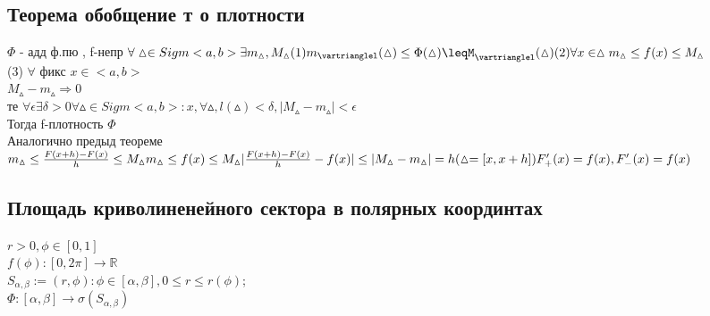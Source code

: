 \documentclass[12pt, a4paper]{article}
\newcommand{\nl}{\newline}
\begin{document}
{ \subsection{Теорема обобщение т о плотности} 
    $\Phi$ - адд ф.пю , f-непр
   	$ \forall \vartriangle \in Sigm<a,b> \exists m_\vartriangle ,M_\vartriangle \\
    (1)
    m_\vartrianglel(\vartriangle) \leq \Phi(\vartriangle)\leqM_\vartrianglel(\vartriangle)\\
    (2) \forall x \in \vartriangle m_\vartriangle \leq f(x) \leq  M_\vartriangle$\\
    (3) $\forall$ фикс $x \in <a,b>$\\
    $M_\vartriangle-m_\vartriangle \Rightarrow 0$ \\
    те $\forall \epsilon  \exists \delta > 0  \forall \vartriangle \in Sigm<a,b>: x,  \forall \vartriangle, l(\vartriangle) < \delta  ,          |M_\vartriangle - m_\vartriangle|<\epsilon$ \\
     Тогда f-плотность $\Phi$ \\
     \nl
 Аналогично предыд теореме \\
    $m_\vartriangle \leq \frac{F(x+h)-F(x)}{h} \leq M_\vartriangle \\
    m_\vartriangle \leq f(x)\leq M_\vartriangle
    |\frac{F(x+h)-F(x)}{h}-f(x)|\leq |M_\vartriangle-m_\vartriangle| = h (\vartriangle =[x,x+h]) \\
    F_+'(x)=f(x) , F_-'(x)=f(x)$ \\
    
\subsection{Площадь криволиненейного сектора в  полярных координтах}
$r > 0, \phi \in [0,1]$ \\
$f(\phi) : [0,2\pi] \rightarrow \mathbb{R}$\\
$S_{\alpha,\beta}:={(r,\phi) : \phi \in [\alpha,\beta], 0\leq r \leq r(\phi)}$;\\
 $\Phi :[\alpha,\beta]\rightarrow \sigma(S_{\alpha, \beta})$ \\
 
}
\end{document}
